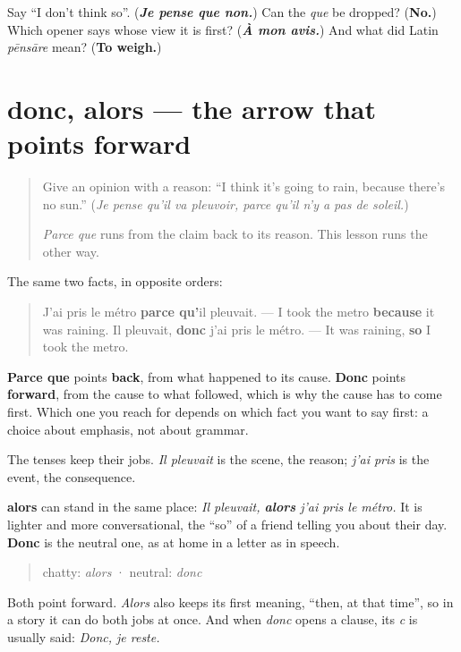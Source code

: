 \begin{tcolorbox}[breakable,colback=teal!4,colframe=teal!35!black,title={Before you move on}]
Say \textquotedblleft{}I don't think so\textquotedblright{}. (\emph{\textbf{Je pense que non.}}) Can the \emph{que} be dropped? (\textbf{No.}) Which opener says whose view it is first? (\emph{\textbf{À mon avis.}}) And what did Latin \emph{pēnsāre} mean? (\textbf{To weigh.})
\end{tcolorbox}
\section[donc, alors]{donc, alors — the arrow that points forward}

\label{lesson:FR-C260-donc}



\begin{quote}
Give an opinion with a reason: \textquotedblleft{}I think it's going to rain, because there's no sun.\textquotedblright{} (\emph{Je pense qu'il va pleuvoir, parce qu'il n'y a pas de soleil.})

\emph{Parce que} runs from the claim back to its reason. This lesson runs the other way.
\end{quote}

\begin{grammarlens}[title={Grammar Lens: the two arrows}]
The same two facts, in opposite orders:

\begin{quote}
J'ai pris le métro \textbf{parce qu'}il pleuvait. — I took the metro \textbf{because} it was raining. Il pleuvait, \textbf{donc} j'ai pris le métro. — It was raining, \textbf{so} I took the metro.
\end{quote}

\textbf{Parce que} points \textbf{back}, from what happened to its cause. \textbf{Donc} points \textbf{forward}, from the cause to what followed, which is why the cause has to come first. Which one you reach for depends on which fact you want to say first: a choice about emphasis, not about grammar.

The tenses keep their jobs. \emph{Il pleuvait} is the scene, the reason; \emph{j'ai pris} is the event, the consequence.
\end{grammarlens}

\begin{grammarlens}[title={Grammar Lens: alors, the chatty one}]
\textbf{alors} can stand in the same place: \emph{Il pleuvait, \textbf{alors} j'ai pris le métro.} It is lighter and more conversational, the \textquotedblleft{}so\textquotedblright{} of a friend telling you about their day. \textbf{Donc} is the neutral one, as at home in a letter as in speech.

\begin{quote}
chatty: \emph{alors} · neutral: \emph{donc}
\end{quote}

Both point forward. \emph{Alors} also keeps its first meaning, \textquotedblleft{}then, at that time\textquotedblright{}, so in a story it can do both jobs at once. And when \emph{donc} opens a clause, its \emph{c} is usually said: \emph{Donc, je reste.}
\end{grammarlens}

